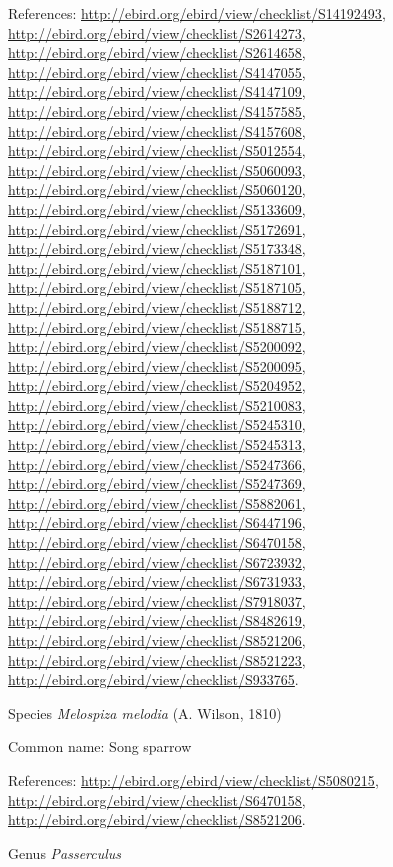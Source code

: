 \documentclass[9pt, article]{memoir}
\begin{document}
\begin{multicols}{2}
References: 
\url{http://ebird.org/ebird/view/checklist/S14192493}, 
\url{http://ebird.org/ebird/view/checklist/S2614273}, 
\url{http://ebird.org/ebird/view/checklist/S2614658}, 
\url{http://ebird.org/ebird/view/checklist/S4147055}, 
\url{http://ebird.org/ebird/view/checklist/S4147109}, 
\url{http://ebird.org/ebird/view/checklist/S4157585}, 
\url{http://ebird.org/ebird/view/checklist/S4157608}, 
\url{http://ebird.org/ebird/view/checklist/S5012554}, 
\url{http://ebird.org/ebird/view/checklist/S5060093}, 
\url{http://ebird.org/ebird/view/checklist/S5060120}, 
\url{http://ebird.org/ebird/view/checklist/S5133609}, 
\url{http://ebird.org/ebird/view/checklist/S5172691}, 
\url{http://ebird.org/ebird/view/checklist/S5173348}, 
\url{http://ebird.org/ebird/view/checklist/S5187101}, 
\url{http://ebird.org/ebird/view/checklist/S5187105}, 
\url{http://ebird.org/ebird/view/checklist/S5188712}, 
\url{http://ebird.org/ebird/view/checklist/S5188715}, 
\url{http://ebird.org/ebird/view/checklist/S5200092}, 
\url{http://ebird.org/ebird/view/checklist/S5200095}, 
\url{http://ebird.org/ebird/view/checklist/S5204952}, 
\url{http://ebird.org/ebird/view/checklist/S5210083}, 
\url{http://ebird.org/ebird/view/checklist/S5245310}, 
\url{http://ebird.org/ebird/view/checklist/S5245313}, 
\url{http://ebird.org/ebird/view/checklist/S5247366}, 
\url{http://ebird.org/ebird/view/checklist/S5247369}, 
\url{http://ebird.org/ebird/view/checklist/S5882061}, 
\url{http://ebird.org/ebird/view/checklist/S6447196}, 
\url{http://ebird.org/ebird/view/checklist/S6470158}, 
\url{http://ebird.org/ebird/view/checklist/S6723932}, 
\url{http://ebird.org/ebird/view/checklist/S6731933}, 
\url{http://ebird.org/ebird/view/checklist/S7918037}, 
\url{http://ebird.org/ebird/view/checklist/S8482619}, 
\url{http://ebird.org/ebird/view/checklist/S8521206}, 
\url{http://ebird.org/ebird/view/checklist/S8521223}, 
\url{http://ebird.org/ebird/view/checklist/S933765}.

\vspace{6pt}\noindent\hspace{36pt}Species \textit{Melospiza melodia} (A. Wilson, 1810)


Common name: Song sparrow

References: 
\url{http://ebird.org/ebird/view/checklist/S5080215}, 
\url{http://ebird.org/ebird/view/checklist/S6470158}, 
\url{http://ebird.org/ebird/view/checklist/S8521206}.

\vspace{6pt}\noindent\hspace{30pt}Genus \textit{Passerculus}



\end{multicols}
\end{document}
